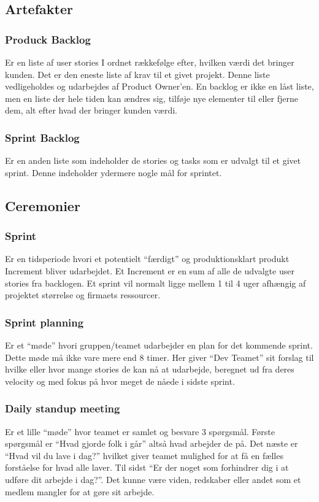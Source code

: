 \subsection{Artefakter}
\subsubsection{Produck Backlog}
Er en liste af user stories I ordnet rækkefølge efter, hvilken værdi det bringer kunden. 
Det er den eneste liste af krav til et givet projekt. Denne liste vedligeholdes og udarbejdes af 
Product Owner’en. En backlog er ikke en låst liste, men en liste der hele tiden kan ændres sig, 
tilføje nye elementer til eller fjerne dem, alt efter hvad der bringer kunden værdi. 

\subsubsection{Sprint Backlog}
Er en anden liste som indeholder de stories og tasks som er udvalgt til et givet sprint. Denne indeholder
ydermere nogle mål for sprintet. 

\subsection{Ceremonier}
\subsubsection{Sprint}
Er en tidsperiode hvori et potentielt “færdigt” og produktionsklart produkt Increment bliver udarbejdet. 
Et Increment er en sum af alle de udvalgte user stories fra backlogen. Et sprint vil normalt ligge mellem 1 til 4 uger 
afhængig af projektet størrelse og firmaets ressourcer.

\subsubsection{Sprint planning}
Er et “møde” hvori gruppen/teamet udarbejder en plan for det kommende sprint. Dette møde må ikke vare mere end 8 timer. 
Her giver “Dev Teamet” sit forslag til hvilke eller hvor mange stories de kan nå at udarbejde, beregnet ud fra deres 
velocity og med fokus på hvor meget de nåede i sidste sprint.

\subsubsection{Daily standup meeting}
Er et lille “møde” hvor teamet er samlet og besvare 3 spørgsmål. Første spørgsmål er “Hvad gjorde folk i går” 
altså hvad arbejder de på. Det næste er “Hvad vil du lave i dag?” hvilket giver teamet mulighed for at få en fælles 
forståelse for hvad alle laver. Til sidst “Er der noget som forhindrer dig i at udføre dit arbejde i dag?”. 
Det kunne være viden, redskaber eller andet som et medlem mangler for at gøre sit arbejde.

